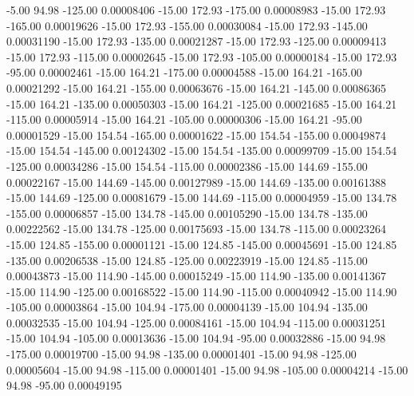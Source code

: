      -5.00     94.98   -125.00     0.00008406
    -15.00    172.93   -175.00     0.00008983
    -15.00    172.93   -165.00     0.00019626
    -15.00    172.93   -155.00     0.00030084
    -15.00    172.93   -145.00     0.00031190
    -15.00    172.93   -135.00     0.00021287
    -15.00    172.93   -125.00     0.00009413
    -15.00    172.93   -115.00     0.00002645
    -15.00    172.93   -105.00     0.00000184
    -15.00    172.93    -95.00     0.00002461
    -15.00    164.21   -175.00     0.00004588
    -15.00    164.21   -165.00     0.00021292
    -15.00    164.21   -155.00     0.00063676
    -15.00    164.21   -145.00     0.00086365
    -15.00    164.21   -135.00     0.00050303
    -15.00    164.21   -125.00     0.00021685
    -15.00    164.21   -115.00     0.00005914
    -15.00    164.21   -105.00     0.00000306
    -15.00    164.21    -95.00     0.00001529
    -15.00    154.54   -165.00     0.00001622
    -15.00    154.54   -155.00     0.00049874
    -15.00    154.54   -145.00     0.00124302
    -15.00    154.54   -135.00     0.00099709
    -15.00    154.54   -125.00     0.00034286
    -15.00    154.54   -115.00     0.00002386
    -15.00    144.69   -155.00     0.00022167
    -15.00    144.69   -145.00     0.00127989
    -15.00    144.69   -135.00     0.00161388
    -15.00    144.69   -125.00     0.00081679
    -15.00    144.69   -115.00     0.00004959
    -15.00    134.78   -155.00     0.00006857
    -15.00    134.78   -145.00     0.00105290
    -15.00    134.78   -135.00     0.00222562
    -15.00    134.78   -125.00     0.00175693
    -15.00    134.78   -115.00     0.00023264
    -15.00    124.85   -155.00     0.00001121
    -15.00    124.85   -145.00     0.00045691
    -15.00    124.85   -135.00     0.00206538
    -15.00    124.85   -125.00     0.00223919
    -15.00    124.85   -115.00     0.00043873
    -15.00    114.90   -145.00     0.00015249
    -15.00    114.90   -135.00     0.00141367
    -15.00    114.90   -125.00     0.00168522
    -15.00    114.90   -115.00     0.00040942
    -15.00    114.90   -105.00     0.00003864
    -15.00    104.94   -175.00     0.00004139
    -15.00    104.94   -135.00     0.00032535
    -15.00    104.94   -125.00     0.00084161
    -15.00    104.94   -115.00     0.00031251
    -15.00    104.94   -105.00     0.00013636
    -15.00    104.94    -95.00     0.00032886
    -15.00     94.98   -175.00     0.00019700
    -15.00     94.98   -135.00     0.00001401
    -15.00     94.98   -125.00     0.00005604
    -15.00     94.98   -115.00     0.00001401
    -15.00     94.98   -105.00     0.00004214
    -15.00     94.98    -95.00     0.00049195
